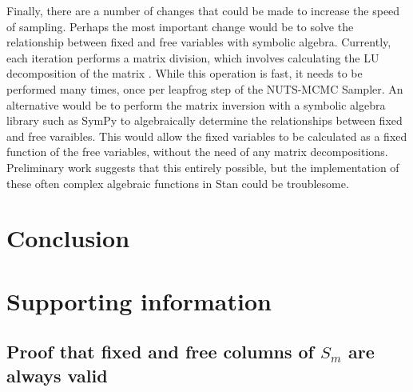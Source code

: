\documentclass[10pt,letterpaper]{article}
\begin{document}
Finally, there are a number of changes that could be made to increase the speed of sampling.
Perhaps the most important change would be to solve the relationship between fixed and free variables with symbolic algebra.
Currently, each iteration performs a matrix division, which involves calculating the LU decomposition of the matrix \cite{stan_r_div}.
While this operation is fast, it needs to be performed many times, once per leapfrog step of the NUTS-MCMC Sampler.
An alternative would be to perform the matrix inversion with a symbolic algebra library such as SymPy \cite{sympy} to algebraically determine the relationships between fixed and free varaibles.
This would allow the fixed variables to be calculated as a fixed function of the free variables, without the need of any matrix decompositions.
Preliminary work suggests that this entirely possible, but the implementation of these often complex algebraic functions in Stan could be troublesome.



%


\section*{Conclusion}



\section*{Supporting information}

\subsection{Proof that fixed and free columns of $S_m$ are always valid}

\end{document}
